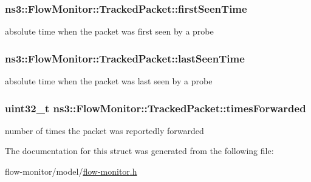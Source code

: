 \subsubsection[{\texorpdfstring{first\+Seen\+Time}{firstSeenTime}}]{ ns3\+::\+Flow\+Monitor\+::\+Tracked\+Packet\+::first\+Seen\+Time}\hypertarget{structns3_1_1FlowMonitor_1_1TrackedPacket_a46d132e43ac7d1c05ab0b691fccb9c73}{}\label{structns3_1_1FlowMonitor_1_1TrackedPacket_a46d132e43ac7d1c05ab0b691fccb9c73}


absolute time when the packet was first seen by a probe 

\subsubsection[{\texorpdfstring{last\+Seen\+Time}{lastSeenTime}}]{ ns3\+::\+Flow\+Monitor\+::\+Tracked\+Packet\+::last\+Seen\+Time}\hypertarget{structns3_1_1FlowMonitor_1_1TrackedPacket_a16e300794c367f5e1ea5131962de8d08}{}\label{structns3_1_1FlowMonitor_1_1TrackedPacket_a16e300794c367f5e1ea5131962de8d08}


absolute time when the packet was last seen by a probe 

\subsubsection[{\texorpdfstring{times\+Forwarded}{timesForwarded}}]{\setlength{\rightskip}{0pt plus 5cm}uint32\+\_\+t ns3\+::\+Flow\+Monitor\+::\+Tracked\+Packet\+::times\+Forwarded}\hypertarget{structns3_1_1FlowMonitor_1_1TrackedPacket_ad55c536da8963b1ba9be7b8d41d6aa39}{}\label{structns3_1_1FlowMonitor_1_1TrackedPacket_ad55c536da8963b1ba9be7b8d41d6aa39}


number of times the packet was reportedly forwarded 



The documentation for this struct was generated from the following file\+:\begin{DoxyCompactItemize}
\item 
flow-\/monitor/model/\hyperlink{flow-monitor_8h}{flow-\/monitor.\+h}\end{DoxyCompactItemize}
